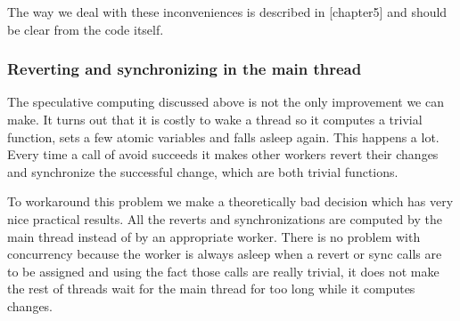The way we deal with these inconveniences is described in [chapter5] and should be clear from the code itself.

\subsubsection{Reverting and synchronizing in the main thread}
The speculative computing discussed above is not the only improvement
we can make. It turns out that it is costly to wake a thread so it computes a trivial function, sets a few atomic variables and falls asleep again. This happens a lot. Every time a call of avoid succeeds it makes other workers revert their changes and synchronize the successful change, which are both trivial functions.

To workaround this problem we make a theoretically bad decision which has very nice practical results. All the reverts and synchronizations are computed by the main thread instead of by an appropriate worker. There is no problem with concurrency because the worker is always asleep when a revert or sync calls are to be assigned and using the fact those calls are really trivial, it does not make the rest of threads wait for the main thread for too long while it computes changes.